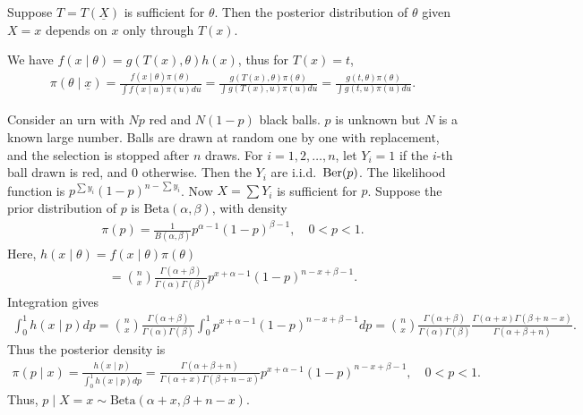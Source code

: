 \begin{theorem}
    Suppose $T = T(\underline{X})$ is sufficient for $\theta$. Then the posterior distribution of $\theta$ given $X = x$ depends on $x$ only through $T(x)$.
\end{theorem}

We have $f(x \mid \theta) = g(T(x),\theta) h(x)$, thus for $T(x) = t$,
\begin{align}
    \pi(\theta \mid \underline{x}) = \frac{f(x \mid \theta)\pi(\theta)}{\int f(x \mid u)\pi(u) du} = \frac{g(T(x),\theta)\pi(\theta)}{\int g(T(x),u)\pi(u) du} = \frac{g(t,\theta)\pi(\theta)}{\int g(t,u)\pi(u) du}.
\end{align}

\begin{example}
    Consider an urn with $Np$ red and $N(1-p)$ black balls. $p$ is unknown but $N$ is a known large number. Balls are drawn at random one by one with replacement, and the selection is stopped after $n$ draws. For $i = 1,2,\ldots,n$, let $Y_{i} = 1$ if the $i$-th ball drawn is red, and $0$ otherwise. Then the $Y_{i}$ are i.i.d.~$\operatorname{Ber}(p)$. The likelihood function is $p^{\sum y_{i}} (1-p)^{n - \sum y_{i}}$. Now $X = \sum Y_{i}$ is sufficient for $p$. Suppose the prior distribution of $p$ is $\mathrm{Beta}(\alpha,\beta)$, with density
    \begin{align}
        \pi(p) = \frac{1}{B(\alpha,\beta)} p^{\alpha - 1} (1-p)^{\beta - 1}, \quad 0 < p < 1.
    \end{align}
    Here, $h(x \mid \theta) = f(x \mid \theta) \pi(\theta)$
    \begin{align}
        = \binom{n}{x} \frac{\Gamma(\alpha + \beta)}{\Gamma(\alpha)\Gamma(\beta)} p^{x + \alpha - 1} (1-p)^{n - x + \beta - 1}.
    \end{align}
    Integration gives
    \begin{align}
        \int_{0}^{1} h(x \mid p) dp = \binom{n}{x} \frac{\Gamma(\alpha + \beta)}{\Gamma(\alpha)\Gamma(\beta)} \int_{0}^{1} p^{x + \alpha - 1} (1-p)^{n - x + \beta - 1} dp = \binom{n}{x} \frac{\Gamma(\alpha + \beta)}{\Gamma(\alpha)\Gamma(\beta)}\frac{\Gamma(\alpha + x) \Gamma(\beta + n - x)}{\Gamma(\alpha + \beta + n)}.
    \end{align}
    Thus the posterior density is
    \begin{align}
        \pi(p \mid x) = \frac{h(x \mid p)}{\int_{0}^{1} h(x \mid p) dp} = \frac{\Gamma(\alpha + \beta + n)}{\Gamma(\alpha + x) \Gamma(\beta + n - x)} p^{x + \alpha - 1} (1-p)^{n - x + \beta - 1}, \quad 0 < p < 1.
    \end{align}
    Thus, $p \mid X = x \sim \mathrm{Beta}(\alpha + x, \beta + n - x)$.
\end{example}


